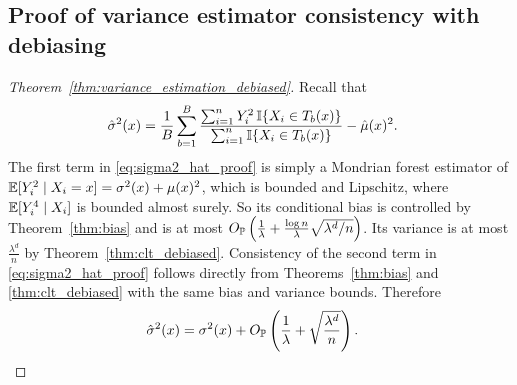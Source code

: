 \subsection*{Proof of variance estimator consistency with debiasing}

\begin{proof}[Theorem~\ref{thm:variance_estimation_debiased}]


  Recall that
  \begin{align}
    \label{eq:sigma2_hat_proof}
    \hat\sigma^2(x)
    &=
    \frac{1}{B}
    \sum_{b=1}^{B}
    \frac{\sum_{i=1}^n Y_i^2 \, \I\{X_i \in T_b(x)\}}
    {\sum_{i=1}^n \I\{X_i \in T_b(x)\}}
    - \hat \mu(x)^2.
  \end{align}
  The first term in \eqref{eq:sigma2_hat_proof}
  is simply a Mondrian forest estimator of
  $\E[Y_i^2 \mid X_i = x] = \sigma^2(x) + \mu(x)^2$,
  which is bounded and Lipschitz,
  where $\E[Y_i^4 \mid X_i]$ is bounded almost surely.
  So its conditional bias is controlled
  by Theorem~\ref{thm:bias} and is at most
  $O_\P \left( \frac{1}{\lambda} +
  \frac{\log n}{\lambda} \sqrt{\lambda^d / n} \right)$.
  Its variance is
  at most $\frac{\lambda^d}{n}$ by Theorem~\ref{thm:clt_debiased}.
  Consistency of the second term in \eqref{eq:sigma2_hat_proof}
  follows directly from Theorems~\ref{thm:bias} and \ref{thm:clt_debiased}
  with the same bias and variance bounds.
  Therefore
  \begin{align*}
    \hat\sigma^2(x)
    &=
    \sigma^2(x)
    + O_\P \left(
      \frac{1}{\lambda}
      + \sqrt{\frac{\lambda^d}{n}}
    \right).
  \end{align*}


\end{proof}
